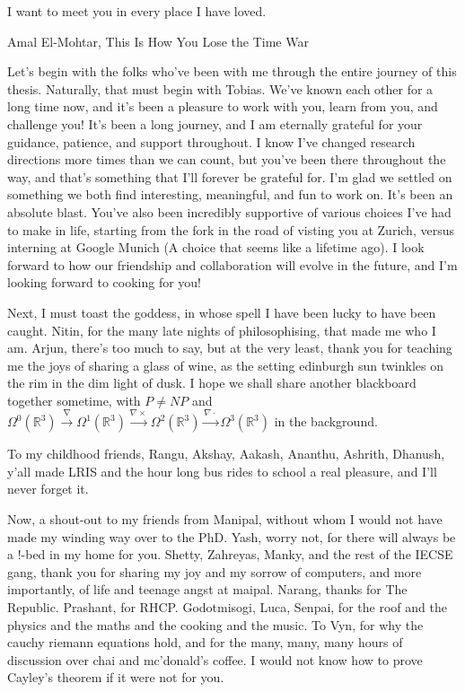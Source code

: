 \epigraph{I want to meet you in every place I have loved.}{Amal El-Mohtar, This Is How You Lose the Time War}

Let's begin with the folks who've been with me through the entire journey of this thesis.
Naturally, that must begin with Tobias. We've known each other for a long time now,
and it's been a pleasure to work with you, learn from you, and challenge you!
It's been a long journey, and I am eternally grateful for your guidance, patience,
and support throughout. %
I know I've changed research directions more times than we can count,
but you've been there throughout the way, and that's something that I'll forever be grateful for.
I'm glad we settled on something we both find interesting, meaningful, and fun to work on.
It's been an absolute blast.
You've also been incredibly supportive of various choices I've had to make in life,
starting from the fork in the road of visting you at Zurich, versus interning at Google Munich (A choice that seems like a lifetime ago).
I look forward to how our friendship and collaboration will evolve in the future,
and I'm looking forward to cooking for you!

Next, I must toast the goddess, in whose spell I have been lucky to have been caught.
Nitin, for the many late nights of philosophising, that made me who I am.
Arjun, there's too much to say,
but at the very least, thank you for teaching me the joys of sharing a glass of wine,
as the setting edinburgh sun twinkles on the rim in the dim light of dusk.
I hope we shall share another blackboard together sometime, with $P \neq NP$ and $\Omega^0(\mathbb R^3) \xrightarrow{\nabla} \Omega^1(\mathbb R^3) \xrightarrow{\nabla \times} \Omega^2(\mathbb R^3) \xrightarrow{\nabla \cdot} \Omega^3(\mathbb R^3)$ in the background.

To my childhood friends, Rangu, Akshay, Aakash, Ananthu, Ashrith, Dhanush,
y'all made LRIS and the hour long bus rides to school a real pleasure,
and I'll never forget it.
%


Now, a shout-out to my friends from Manipal,
without whom I would not have made my winding way over to the PhD.
Yash, worry not, for there will always be a !-bed in my home for you.
Shetty, Zahreyas, Manky, and the rest of the IECSE gang, thank you for sharing my joy and my sorrow of computers,
and more importantly, of life and teenage angst at maipal.
Narang, thanks for The Republic. Prashant, for RHCP. 
Godotmisogi, Luca, Senpai, for the roof and the physics and the maths and the cooking and the music.
To Vyn, for why the cauchy riemann equations hold, and for the many, many,
many hours of discussion over chai and mc'donald's coffee.
I would not know how to prove Cayley's theorem if it were not for you.


